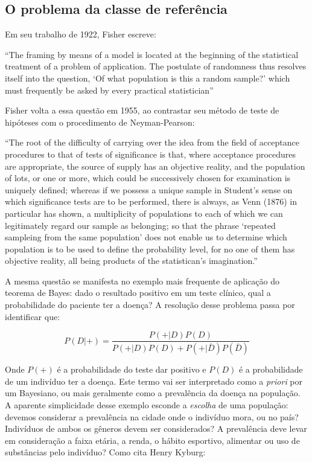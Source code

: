 \begin{shaded}
\section{O problema da classe de referência}\label{sec:classref}

Em seu trabalho de 1922, Fisher escreve:

``The framing by means of a model is located at the beginning of the
statistical treatment of a problem of application. The postulate of randomness thus resolves itself into the 
question, `Of what population is this a random sample?' which must frequently be asked by every practical
statistician''\citep{Fisher1922}

Fisher volta a essa questão em 1955, ao contrastar seu método de teste de hipóteses com o procedimento de Neyman-Pearson:

``The root of the difficulty of carrying over the idea from the field of acceptance procedures to that of tests of significance
is that, where acceptance procedures are appropriate, the source of supply has an objective reality, and the population
of lots, or one or more, which could be successively chosen for examination is uniquely defined; whereas if we possess a unique
sample in Student's sense on which significance tests are to be performed, there is always, as Venn (1876) in particular has
shown, a multiplicity of populations to each of which we can legitimately regard our sample as belonging; so that the phrase
`repeated sampleing from the same population' does not enable us to determine which population is to be used to define the
probability level, for no one of them has objective reality, all being products of the statistican's imagination.''
\citep{Fisher1955}

A mesma questão se manifesta no exemplo mais frequente de aplicação do teorema de Bayes: dado o resultado positivo em um
teste clínico, qual a probabilidade do paciente ter a doença? A resolução desse problema passa por identificar que:

\begin{equation}
P(D|+) = \frac{P(+|D)P(D)}{P(+|D)P(D)+P(+|\bar D) P(\bar D)}
\end{equation}

Onde $P(+)$ é a probabilidade do teste dar positivo 
e $P(D)$ é a probabilidade de um
indivíduo ter a doença. Este termo vai ser interpretado como a {\em priori} por um Bayesiano, ou mais geralmente
como a prevalência da doença na população. A aparente simplicidade desse exemplo esconde a {\em escolha} de uma população:
devemos considerar a prevalência na cidade onde o indivíduo mora, ou no país? Indivíduos de ambos os gêneros devem ser
considerados? A prevalência deve levar em consideração a faixa etária, a renda, o hábito esportivo, alimentar ou uso de
substâncias pelo indivíduo? Como cita Henry Kyburg:


\end{shaded}
